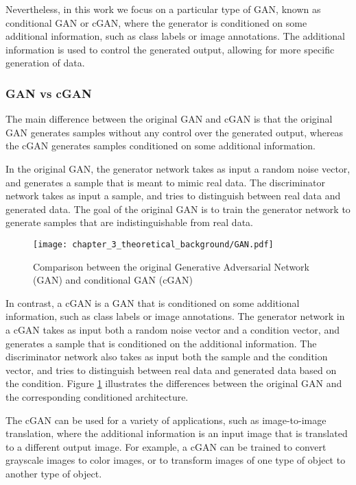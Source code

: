 Nevertheless, in this work we focus on a particular type of GAN, known as conditional GAN or cGAN, where the generator is conditioned on some additional information, such as class labels or image annotations. The additional information is used to control the generated output, allowing for more specific generation of data. 

\subsubsection{GAN vs cGAN}
\label{subsubsec:3_cGAN}

The main difference between the original GAN and cGAN is that the original GAN generates samples without any control over the generated output, whereas the cGAN generates samples conditioned on some additional information.

In the original GAN, the generator network takes as input a random noise vector, and generates a sample that is meant to mimic real data. The discriminator network takes as input a sample, and tries to distinguish between real data and generated data. The goal of the original GAN is to train the generator network to generate samples that are indistinguishable from real data.

\begin{figure}[h]
	\centering
	\texttt{[image: chapter\_3\_theoretical\_background/GAN.pdf]}
	\caption{Comparison between the original Generative Adversarial Network (GAN) and conditional GAN (cGAN)}
	\label{fig:chapter_3_theoretical_background/GAN}
\end{figure}

In contrast, a cGAN is a GAN that is conditioned on some additional information, such as class labels or image annotations. The generator network in a cGAN takes as input both a random noise vector and a condition vector, and generates a sample that is conditioned on the additional information. The discriminator network also takes as input both the sample and the condition vector, and tries to distinguish between real data and generated data based on the condition. Figure \ref{fig:chapter_3_theoretical_background/GAN} illustrates the differences between the original GAN and the corresponding conditioned architecture.

The cGAN can be used for a variety of applications, such as image-to-image translation, where the additional information is an input image that is translated to a different output image. For example, a cGAN can be trained to convert grayscale images to color images, or to transform images of one type of object to another type of object.

